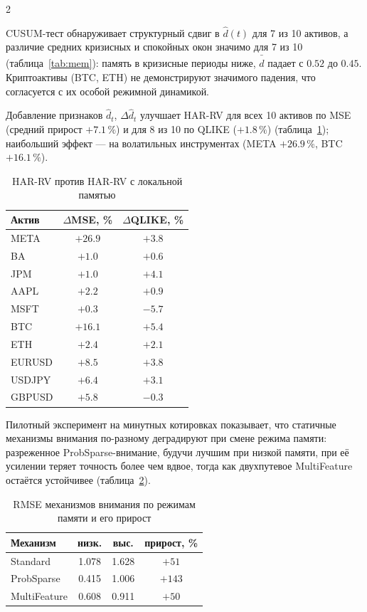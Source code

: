 \documentclass[a4paper,10pt,twoside]{article}
\begin{document}
\begin{multicols}{2}

CUSUM-тест обнаруживает структурный сдвиг в $\hat d(t)$ для 7 из 10 активов, а различие средних кризисных и спокойных окон значимо для 7 из 10 (таблица~\ref{tab:mem}): память в кризисные периоды ниже, $\bar{\hat d}$ падает с $0.52$ до $0.45$. Криптоактивы (BTC, ETH) не демонстрируют значимого падения, что согласуется с их особой режимной динамикой.

Добавление признаков $\hat d_t$, $\Delta\hat d_t$ улучшает HAR-RV для всех 10 активов по MSE (средний прирост $+7.1\,\%$) и для 8 из 10 по QLIKE ($+1.8\,\%$) (таблица~\ref{tab:har}); наибольший эффект --- на волатильных инструментах (META $+26.9\,\%$, BTC $+16.1\,\%$).

\begin{table}[H]
\centering\small
\caption{HAR-RV против HAR-RV с локальной памятью}
\label{tab:har}
\begin{tabularx}{\columnwidth}{|X|c|c|}
\hline
Актив & $\Delta$MSE, \% & $\Delta$QLIKE, \% \\
\hline
META   & $+26.9$ & $+3.8$ \\
BA     & $+1.0$  & $+0.6$ \\
JPM    & $+1.0$  & $+4.1$ \\
AAPL   & $+2.2$  & $+0.9$ \\
MSFT   & $+0.3$  & $-5.7$ \\
BTC    & $+16.1$ & $+5.4$ \\
ETH    & $+2.4$  & $+2.1$ \\
EURUSD & $+8.5$  & $+3.8$ \\
USDJPY & $+6.4$  & $+3.1$ \\
GBPUSD & $+5.8$  & $-0.3$ \\
\hline
\end{tabularx}
\end{table}

Пилотный эксперимент на минутных котировках показывает, что статичные механизмы внимания по-разному деградируют при смене режима памяти: разреженное ProbSparse-внимание, будучи лучшим при низкой памяти, при её усилении теряет точность более чем вдвое, тогда как двухпутевое MultiFeature остаётся устойчивее (таблица~\ref{tab:attn}).

\begin{table}[H]
\centering\small
\caption{RMSE механизмов внимания по режимам памяти и его прирост}
\label{tab:attn}
\begin{tabularx}{\columnwidth}{|X|c|c|c|}
\hline
Механизм & низк. & выс. & прирост, \% \\
\hline
Standard & 1.078 & 1.628 & $+51$ \\
ProbSparse & 0.415 & 1.006 & $+143$ \\
MultiFeature & 0.608 & 0.911 & $+50$ \\
\hline
\end{tabularx}
\end{table}


\end{multicols}
\end{document}
